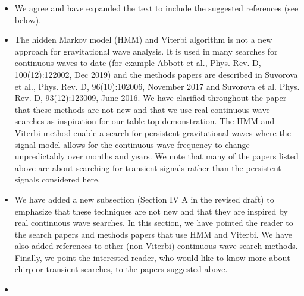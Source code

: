 \documentclass{article}
\newcommand{\todo}{\textcolor{blue}}
\newcommand{\han}{\textcolor{orange}}
\begin{document}
\begin{itemize}
\item We agree and have expanded the text to include the suggested references (see below). 
\item The hidden Markov model (HMM) and Viterbi algorithm is not a new approach for gravitational wave analysis. It is used in many searches for continuous waves to date (for example Abbott et al., Phys. Rev. D, 100(12):122002, Dec 2019) and the methods papers are described in Suvorova et al., Phys. Rev. D, 96(10):102006, November 2017 and Suvorova et al. Phys. Rev. D, 93(12):123009, June 2016. We have clarified throughout the paper that these methods are not new and that we use real continuous wave searches as inspiration for our table-top demonstration. The HMM and Viterbi method enable a search for persistent gravitational waves where the signal model allows for the continuous wave frequency to change unpredictably over months and years. We note that many of the papers listed above are about searching for transient signals rather than the persistent signals considered here. 
\item We have added a new subsection (Section IV A in the revised draft) to emphasize that these techniques are not new and that they are inspired by real continuous wave searches. In this section, we have pointed the reader to the search papers and methods papers that use HMM and Viterbi. We have also added references to other (non-Viterbi) continuous-wave search methods. Finally, we point the interested reader, who would like to know more about chirp or transient searches, to the papers suggested above. 
\item[]
\end{itemize}
\end{document}
